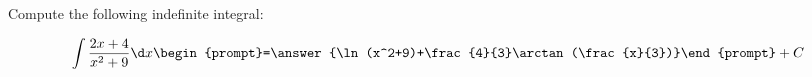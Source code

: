 \documentclass{ximera}
\author{Jim Talamo}
\begin{document}
\begin{exercise}
Compute the following indefinite integral:

\[
\int \frac{2x+4}{x^2+9} \d x 
\begin{prompt}=\answer{\ln(x^2+9)+\frac{4}{3}\arctan(\frac{x}{3})}\end{prompt}+C
\]
\end{exercise}
\end{document}
